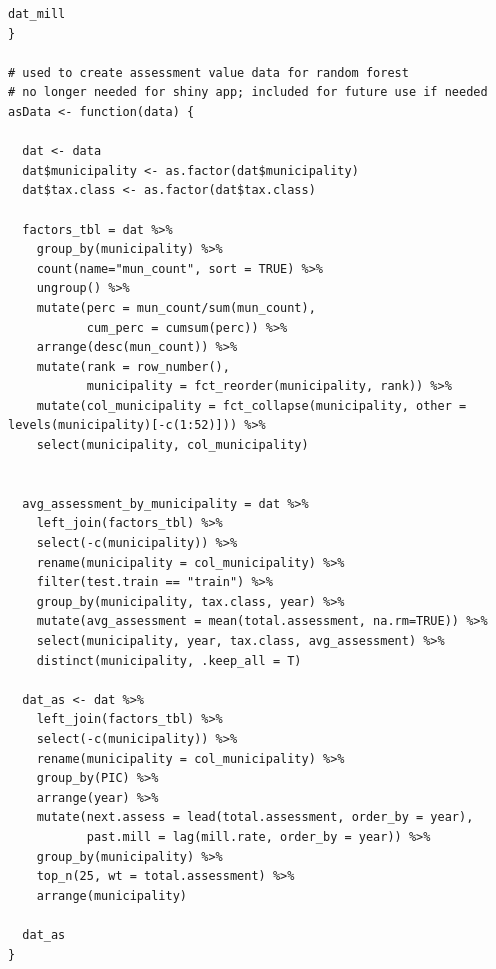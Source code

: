 \documentclass{article}
\begin{document}
\begin{lstlisting}[style=R, caption={Code used for the Shiny app.}, captionpos=b]
  dat_mill
}

# used to create assessment value data for random forest
# no longer needed for shiny app; included for future use if needed
asData <- function(data) {
  
  dat <- data
  dat$municipality <- as.factor(dat$municipality)
  dat$tax.class <- as.factor(dat$tax.class)
  
  factors_tbl = dat %>% 
    group_by(municipality) %>% 
    count(name="mun_count", sort = TRUE) %>% 
    ungroup() %>% 
    mutate(perc = mun_count/sum(mun_count),
           cum_perc = cumsum(perc)) %>% 
    arrange(desc(mun_count)) %>% 
    mutate(rank = row_number(),
           municipality = fct_reorder(municipality, rank)) %>% 
    mutate(col_municipality = fct_collapse(municipality, other = levels(municipality)[-c(1:52)])) %>% 
    select(municipality, col_municipality)
  
  
  avg_assessment_by_municipality = dat %>% 
    left_join(factors_tbl) %>% 
    select(-c(municipality)) %>% 
    rename(municipality = col_municipality) %>% 
    filter(test.train == "train") %>% 
    group_by(municipality, tax.class, year) %>% 
    mutate(avg_assessment = mean(total.assessment, na.rm=TRUE)) %>% 
    select(municipality, year, tax.class, avg_assessment) %>% 
    distinct(municipality, .keep_all = T)
  
  dat_as <- dat %>% 
    left_join(factors_tbl) %>% 
    select(-c(municipality)) %>% 
    rename(municipality = col_municipality) %>% 
    group_by(PIC) %>% 
    arrange(year) %>% 
    mutate(next.assess = lead(total.assessment, order_by = year),
           past.mill = lag(mill.rate, order_by = year)) %>% 
    group_by(municipality) %>% 
    top_n(25, wt = total.assessment) %>% 
    arrange(municipality)
  
  dat_as
}

\end{lstlisting}
\end{document}
